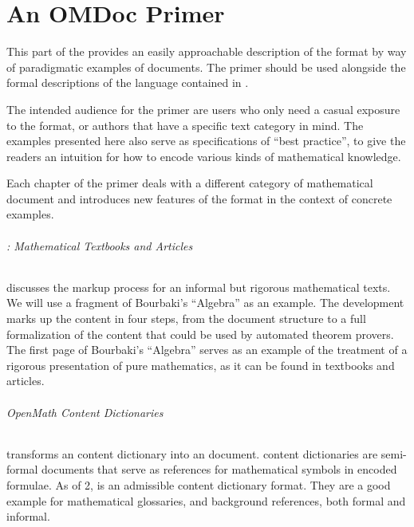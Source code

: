 
\part{An OMDoc Primer}\label{part:primer}
This part of the {\report} provides an easily approachable description of the {\omdoc}
format by way of paradigmatic examples of {\omdoc} documents.  The primer should be used
alongside the formal descriptions of the language contained in
{}.

The intended audience for the primer are users who only need a casual exposure to the
format, or authors that have a specific text category in mind.  The examples presented
here also serve as specifications of ``best practice'', to give the readers an intuition
for how to encode various kinds of mathematical knowledge.

Each chapter of the {\omdoc} primer deals with a different category of mathematical
document and introduces new features of the {\omdoc} format in the context of concrete
examples.

\paragraph{: Mathematical Textbooks and Articles} discusses the markup
process for an informal but rigorous mathematical texts.  We will use a fragment of
Bourbaki's ``Algebra'' as an example.  The development marks up the content in four steps,
from the document structure to a full formalization of the content that could be used by
automated theorem provers.  The first page of Bourbaki's ``Algebra'' serves as an example
of the treatment of a rigorous presentation of pure mathematics, as it can be found in
textbooks and articles.

\paragraph{ OpenMath Content Dictionaries} transforms an {\openmath}
content dictionary into an {\omdoc} document. {\openmath} content dictionaries are
semi-formal documents that serve as references for mathematical symbols in {\openmath}
encoded formulae.  As of {\openmath}2, {\omdoc} is an admissible {\openmath} content
dictionary format. They are a good example for mathematical glossaries, and background
references, both formal and informal.

